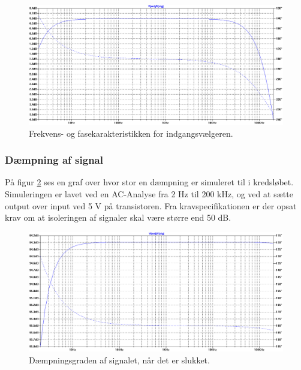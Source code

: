 \begin{figure}[h]
\centering
\includegraphics[width=\textwidth]{teknisk/indgangsvaelger/simulering/frekvenskarakteristik.png}
\caption{Frekvens- og fasekarakteristikken for indgangsvælgeren.}
\label{indgangsvaelger_frekvenskarakteristik}
\end{figure}

\subsubsection*{Dæmpning af signal}
På figur \ref{indgangsvaelger_daempniing} ses en graf over hvor stor en dæmpning er simuleret til i kredsløbet. Simuleringen er lavet ved en AC-Analyse fra 2 Hz til 200 kHz, og ved at sætte output over input ved 5 V på transistoren. Fra kravspecifikationen er der opsat krav om at isoleringen af signaler skal være større end 50 dB.
\begin{figure}[h]
\centering
\includegraphics[width=\textwidth]{teknisk/indgangsvaelger/simulering/daempning_af_signal.png}
\caption{Dæmpningsgraden af signalet, når det er slukket.}
\label{indgangsvaelger_daempniing}
\end{figure}

